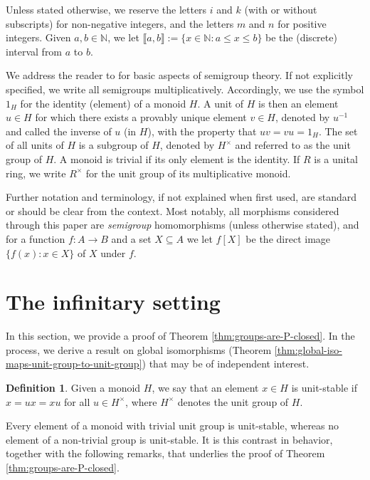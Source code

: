 \documentclass[11pt,reqno]{amsart}
\theoremstyle{definition}
\newtheorem{definition}[theorem]{Definition}
\theoremstyle{remark}
\theoremstyle{theoremdd}
\providecommand\llb{\llbracket}
\providecommand\rrb{\rrbracket}
\newcommand{\evid}[1]{\textsf{#1}}
\providecommand\llb{\llbracket}
\providecommand\rrb{\rrbracket}
\renewcommand{\,}{\kern 0.1em}
\begin{document}
Unless stated otherwise, we reserve the letters $i$ and $k$ (with or without subscripts) for non-negative integers, and the letters $m$ and $n$ for positive integers.
Given $a, b \in \mathbb N$, we let $\llb a, b \rrb := \{x \in \allowbreak \mathbb N \colon \allowbreak a \le x \le b\}$ be the (\evid{discrete}) \evid{interval} from $a$ to $b$.

We address the reader to \cite{Ho95} for basic aspects of semigroup theory. If not explicitly specified, we write all semigroups multiplicatively. Accordingly, we use the symbol $1_H$ for the identity (element) of a monoid $H$.
A \evid{unit} of $H$ is then an element $u \in H$ for which there exists a provably unique element $v \in H$, denoted by $u^{-1}$ and called the \evid{inverse} of $u$ (in $H$), with the property that $uv = vu = 1_H$. The set of all units of $H$ is a subgroup of $H$, denoted by $H^\times$ and referred to as the \evid{unit group} of $H$. A monoid is \evid{trivial} if its only element is the identity. If $R$ is a unital ring, we write $R^\times$ for the unit group of its multiplicative monoid. 


Further notation and ter\-mi\-nol\-o\-gy, if not explained when first used, are standard or should be clear from the context. Most notably, all morphisms considered through this paper are \textit{semigroup} homomorphisms (unless otherwise stated), and for a function $f: A \to B$ and a set $X \subseteq A$ we let $f[X]$ be the \evid{direct image} $\{f(x): x \in X\}$ of $X$ under $f$.
\section{The infinitary setting}
\label{sect:2}


In this section, we provide a proof of Theorem \ref{thm:groups-are-P-closed}. In the process, we derive a result on global isomorphisms (Theorem \ref{thm:global-iso-maps-unit-group-to-unit-group}) that may be of independent interest. 


\begin{definition}
\label{def:unit-stable-element}
Given a monoid $H$, we say that an element $x \in H$ is \evid{unit-stable} if $x = ux = xu$ for all $u \in H^\times$, where $H^\times$ denotes the unit group of $H$. 
\end{definition}

Every element of a monoid with trivial unit group is unit-stable, whereas no element of a non-trivial group is unit-stable. It is this contrast in behavior, together with the following remarks, that underlies the proof of Theorem \ref{thm:groups-are-P-closed}.
\end{document}
